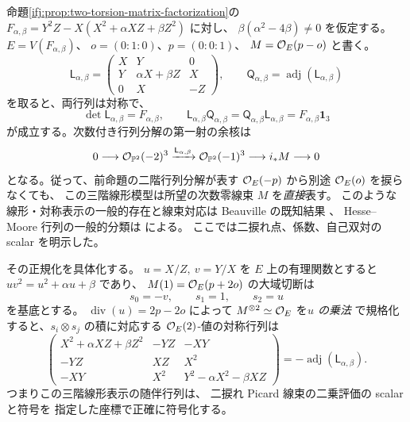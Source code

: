 \begin{proposition}
\label{ifj:prop:picard-symmetric-linear-mf}
命題\ref{ifj:prop:two-torsion-matrix-factorization}の
$F_{\alpha,\beta}=Y^2Z-X(X^2+\alpha XZ+\beta Z^2)$ に対し、
$\beta(\alpha^2-4\beta)\ne0$ を仮定する。
$E=V(F_{\alpha,\beta})$、
$o=(0:1:0)$、$p=(0:0:1)$、
$M=\mathcal O_E(p-o)$ と書く。
\[
 \mathsf L_{\alpha,\beta}
 =\begin{pmatrix}
 X&Y&0\\
 Y&\alpha X+\beta Z&X\\
 0&X&-Z
 \end{pmatrix},\qquad
 \mathsf Q_{\alpha,\beta}
   =\operatorname{adj}(\mathsf L_{\alpha,\beta})
\]
を取ると、両行列は対称で、
\begin{equation}\label{ifj:eq:picard-symmetric-linear-mf}
 \det\mathsf L_{\alpha,\beta}=F_{\alpha,\beta},
 \qquad
 \mathsf L_{\alpha,\beta}\mathsf Q_{\alpha,\beta}
 =\mathsf Q_{\alpha,\beta}\mathsf L_{\alpha,\beta}
 =F_{\alpha,\beta}\mathbf1_3
\end{equation}
が成立する。次数付き行列分解の第一射の余核は
\begin{equation}\label{ifj:eq:picard-symmetric-cokernel}
 0\longrightarrow\mathcal O_{\mathbb P^2}(-2)^3
   \xrightarrow{\mathsf L_{\alpha,\beta}}
    \mathcal O_{\mathbb P^2}(-1)^3
   \longrightarrow i_*M\longrightarrow0
\end{equation}
となる。従って、前命題の二階行列分解が表す
$\mathcal O_E(-p)$ から別途 $\mathcal O_E(o)$ を捩らなくても、
この三階線形模型は所望の次数零線束 $M$ を\emph{直接}表す。
このような線形・対称表示の一般的存在と線束対応は
Beauville の既知結果
\cite[Propositions~3.1 and~4.2]{IFJBeauvilleDeterminantal}、
Hesse--Moore 行列の一般的分類は
\cite[Theorem~A]{IFMBuchweitzPavlov}による。
ここでは二捩れ点、係数、自己双対の scalar を明示した。

その正規化を具体化する。
$u=X/Z,\ v=Y/X$ を $E$ 上の有理関数とすると
$uv^2=u^2+\alpha u+\beta$ であり、
$M(1)=\mathcal O_E(p+2o)$ の大域切断は
\begin{equation}\label{ifj:eq:picard-symmetric-section-basis}
 s_0=-v,\qquad s_1=1,\qquad s_2=u
\end{equation}
を基底とする。
$\operatorname{div}(u)=2p-2o$ によって
$M^{\otimes2}\simeq\mathcal O_E$ を\emph{$u$ の乗法}
で規格化すると、$s_i\otimes s_j$ の積に対応する
$\mathcal O_E(2)$-値の対称行列は
\begin{equation}\label{ifj:eq:picard-symmetric-square-pairing}
 \begin{pmatrix}
 X^2+\alpha XZ+\beta Z^2&-YZ&-XY\\
 -YZ&XZ&X^2\\
 -XY&X^2&Y^2-\alpha X^2-\beta XZ
 \end{pmatrix}
        =-\operatorname{adj}(\mathsf L_{\alpha,\beta}).
\end{equation}
つまりこの三階線形表示の随伴行列は、
二捩れ Picard 線束の二乗評価の scalar と符号を
指定した座標で正確に符号化する。


\end{proposition}
